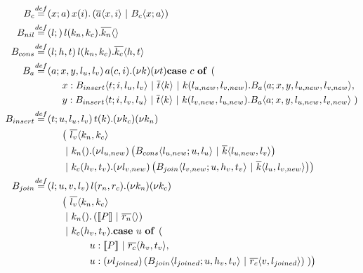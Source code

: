 \begin{align}
  \adef*{B_c}{x}{a}{\arcv{x}{i} . \parens{\asnd{a}{x,i} \apar \ains{B_c}{x}{a}}}
  \\
  \adef*{B_{nil}}{l}{}{\arcv{l}{k_n,k_c} . \asnd{k_n}{}}
  \\
  \adef*{B_{cons}}{l}{h,t}{\arcv{l}{k_n,k_c} . \asnd{k_c}{h,t}}
  \\
  \adef*{B_a}{a}{x,y,l_u,l_v}{
    \arcv{a}{c,i} . \anew{k}{\anew{t}{
      \acse{c}{ \right. \nonumber \\
        & \hspace{1cm}
          \aalt{x}{\ains{B_{insert}}{t}{i, l_u, l_v} \apar \asnd{t}{k} \apar \arcv{k}{l_{u,new},l_{v,new}} . \ains{B_a}{a}{x, y, l_{u,new}, l_{v,new}}}, \nonumber \\
        & \hspace{1cm}
          \aalt{y}{\ains{B_{insert}}{t}{i, l_v, l_u} \apar \asnd{t}{k} \apar \arcv{k}{l_{v,new},l_{u,new}} . \ains{B_a}{a}{x, y, l_{u,new}, l_{v,new}}}
    \left.}}}
  } \\
  \adef*{B_{insert}}{t}{u,l_u,l_v}{
    \arcv{t}{k} . \anew{k_c}{\anew{k_n}{ \nonumber \\
      & \hspace{1cm}
        \bigl(\ \asnd{l_v}{k_n,k_c} \nonumber \\
      & \hspace{1cm}
        \apar \arcv{k_n}{} . \anew{l_{u,new}}{\parens{\ains{B_{cons}}{l_{u,new}}{u, l_u} \apar \asnd{k}{l_{u,new},l_v}}} \nonumber \\
      & \hspace{1cm}
        \apar \arcv{k_c}{h_v,t_v} . \anew{l_{v,new}}{\parens{\ains{B_{join}}{l_{v,new}}{u, h_v, t_v} \apar \asnd{k}{l_u,l_{v,new}}}} \bigr)
    }}
  } \\
  \adef*{B_{join}}{l}{u,v,l_v}{
    \arcv{l}{r_n,r_c} . \anew{k_n}{\anew{k_c}{ \nonumber \\
      & \hspace{1cm}
        \bigl(\ \asnd{l_v}{k_n,k_c} \nonumber \\
      & \hspace{1cm}
        \apar \arcv{k_n}{} . \parens{\encMJtoAP{P} \apar \asnd{r_n}{}} \nonumber \\
      & \hspace{1cm}
        \apar \arcv{k_c}{h_v,t_v} . \acse{u}{ \right. \nonumber \\
          & \hspace{2cm}
            \aalt{u}{\encMJtoAP{P} \apar \asnd{r_c}{h_v,t_v}}, \nonumber \\
          & \hspace{2cm}
            \aalt{u}{\anew{l_{joined}}{\parens{\ains{B_{join}}{l_{joined}}{u, h_v, t_v} \apar \asnd{r_c}{v,l_{joined}}}}}
        \left.}\bigr)
    }}
  }
\end{align}
